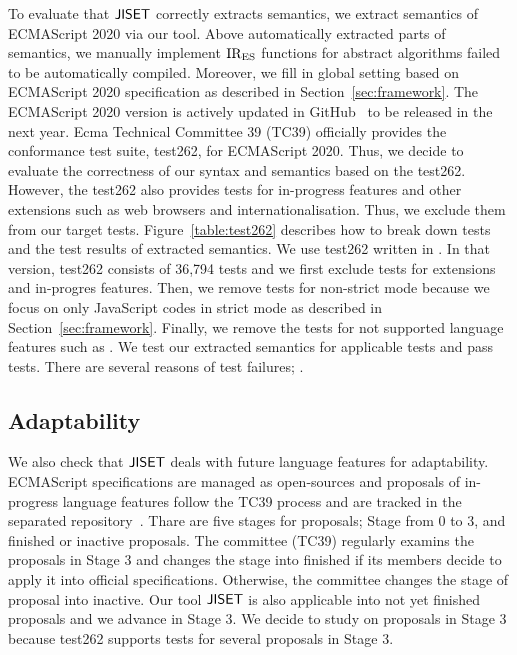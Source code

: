 To evaluate that \( \text{\sf JISET} \) correctly extracts semantics, we extract semantics of ECMAScript
2020 via our tool. Above automatically extracted parts of semantics, we manually implement
 \( \text{IR}_\text{ES} \) functions for abstract algorithms failed to be automatically compiled.
Moreover, we fill in global setting based on ECMAScript 2020 specification as described
in Section~\ref{sec:framework}. The ECMAScript 2020 version is actively updated in
GitHub~\cite{es2020} to be released in the next year. Ecma Technical Committee 39 (TC39)
officially provides the conformance test suite, test262, for ECMAScript 2020.
Thus, we decide to evaluate the correctness of our syntax and semantics based on the test262.
However, the test262 also provides tests for in-progress features and other extensions
such as web browsers and internationalisation. Thus, we exclude them from our target tests.
Figure~\ref{table:test262} describes how to break down tests and the test results of extracted
semantics. We use test262 written in . In that version,
test262 consists of 36,794 tests and we first exclude  tests
for extensions and in-progres features. Then, we remove tests for non-strict mode because
we focus on only JavaScript codes in strict mode
as described in Section~\ref{sec:framework}. Finally, we remove the  tests
for not supported language features such as .
We test our extracted semantics for  applicable tests and pass  tests.
There are several reasons of test failures; .

\subsection{Adaptability}

We also check that \( \text{\sf JISET} \) deals with future language features for adaptability.
ECMAScript specifications are managed as open-sources and proposals of in-progress language
features follow the TC39 process and are tracked in the separated repository~\cite{proposals}.
Thare are five stages for proposals; Stage from 0 to 3, and finished or inactive proposals.
The committee (TC39) regularly examins the proposals in Stage 3 and changes the stage into
finished if its members decide to apply it into official specifications. Otherwise, the committee
changes the stage of proposal into inactive. Our tool \( \text{\sf JISET} \) is also applicable into
not yet finished proposals and we advance  in Stage 3.
We decide to study on proposals in Stage 3 because test262 supports tests for several
proposals in Stage 3.

